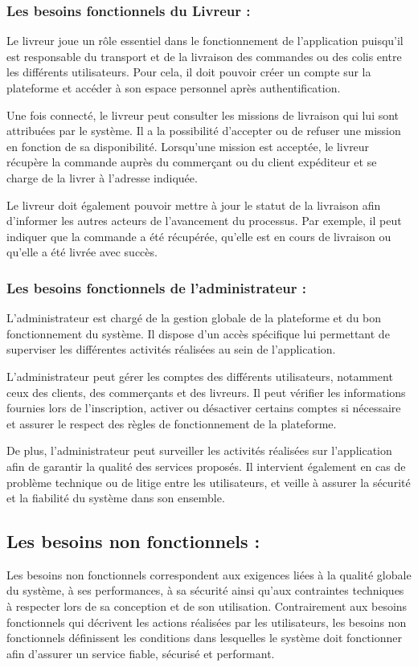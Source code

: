 \documentclass[12pt,fleqn,a4paper]{report}
\begin{document}
\begin{justify}
\subsubsection{Les besoins fonctionnels du Livreur :}
Le livreur joue un rôle essentiel dans le fonctionnement de l'application puisqu'il est responsable du transport et de la livraison des commandes ou des colis entre les différents utilisateurs. Pour cela, il doit pouvoir créer un compte sur la plateforme et accéder à son espace personnel après authentification.

Une fois connecté, le livreur peut consulter les missions de livraison qui lui sont attribuées par le système. Il a la possibilité d'accepter ou de refuser une mission en fonction de sa disponibilité. Lorsqu'une mission est acceptée, le livreur récupère la commande auprès du commerçant ou du client expéditeur et se charge de la livrer à l'adresse indiquée.

Le livreur doit également pouvoir mettre à jour le statut de la livraison afin d'informer les autres acteurs de l'avancement du processus. Par exemple, il peut indiquer que la commande a été récupérée, qu'elle est en cours de livraison ou qu'elle a été livrée avec succès.

\subsubsection{Les besoins fonctionnels de l'administrateur :}
L'administrateur est chargé de la gestion globale de la plateforme et du bon fonctionnement du système. Il dispose d'un accès spécifique lui permettant de superviser les différentes activités réalisées au sein de l'application.

L'administrateur peut gérer les comptes des différents utilisateurs, notamment ceux des clients, des commerçants et des livreurs. Il peut vérifier les informations fournies lors de l'inscription, activer ou désactiver certains comptes si nécessaire et assurer le respect des règles de fonctionnement de la plateforme.

De plus, l'administrateur peut surveiller les activités réalisées sur l'application afin de garantir la qualité des services proposés. Il intervient également en cas de problème technique ou de litige entre les utilisateurs, et veille à assurer la sécurité et la fiabilité du système dans son ensemble.

\subsection{Les besoins non fonctionnels :}
Les besoins non fonctionnels correspondent aux exigences liées à la qualité globale du système, à ses performances, à sa sécurité ainsi qu'aux contraintes techniques à respecter lors de sa conception et de son utilisation. Contrairement aux besoins fonctionnels qui décrivent les actions réalisées par les utilisateurs, les besoins non fonctionnels définissent les conditions dans lesquelles le système doit fonctionner afin d'assurer un service fiable, sécurisé et performant.


\end{justify}
\end{document}
